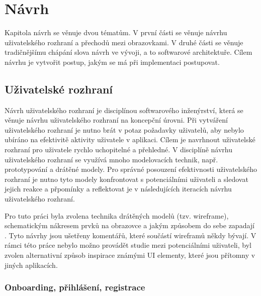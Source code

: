 
\chapter{Návrh}

Kapitola návrh se věnuje dvou tématům. V první části se věnuje návrhu uživatelského rozhraní a přechodů mezi obrazovkami. V druhé části se věnuje tradičnějšímu chápání slova návrh ve vývoji, a to softwarové architektuře. Cílem návrhu je vytvořit postup, jakým se má při implementaci postupovat.

\section{Uživatelské rozhraní}

Návrh uživatelského rozhraní je disciplínou softwarového inženýrství, která se věnuje návrhu uživatelského rozhraní na koncepční úrovni. Při vytváření uživatelského rozhraní je nutno brát v potaz požadavky uživatelů, aby nebylo ubíráno na efektivitě aktivity uživatele v aplikaci. Cílem je navrhnout uživatelské rozhraní pro uživatele rychlo uchopitelné a přehledné. V disciplíně návrhu uživatelského rozhraní se využívá mnoho modelovacích technik, např. prototypování a drátěné modely. Pro správné posouzení efektivnosti uživatelského rozhraní je nutno tyto modely konfrontovat s potenciálními uživateli a sledovat jejich reakce a přpomínky a reflektovat je v následujících iteracích návrhu uživatelského rozhraní. 

Pro tuto práci byla zvolena technika drátěných modelů (tzv. wireframe), schematickým nákresem prvků na obrazovce a jakým způsobem do sebe zapadají \cite{garrett2010elements}. Tyto návrhy jsou ušetřeny komentářů, které součástí wireframů někdy bývají. V rámci této práce nebylo možno provádět studie mezi potenciálními uživateli, byl zvolen alternativní způsob inspirace známými UI elementy, které jsou přítomny v jiných aplikacích. 



\subsection{Onboarding, přihlášení, registrace}

